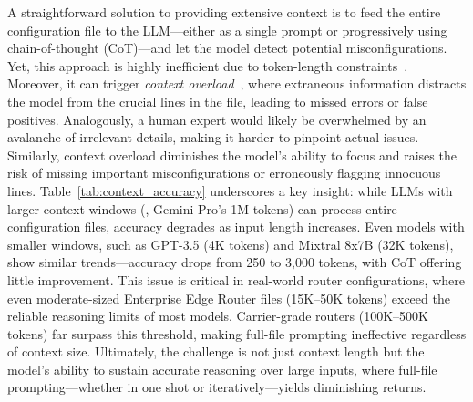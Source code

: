 \begin{table}
    \centering
\caption{Comparison of context window sizes and accuracy degradation with increasing input/prompt length.}
    \label{tab:context_accuracy}
\end{table}

 
A straightforward solution to providing extensive context is to feed the entire
configuration file to the LLM—either as a single prompt or progressively using chain-of-thought (CoT)—and let
the model detect potential misconfigurations. Yet, this approach is highly inefficient
due to token-length constraints~\cite{xue2024repeat,yu2024breaking,gu2023mamba}.
Moreover, it can trigger \emph{context overload}~\cite{lican,li2024long,qian2024long},
where extraneous information distracts the model from the crucial lines in the file,
leading to missed errors or false positives. Analogously, a human expert would likely
be overwhelmed by an avalanche of irrelevant details, making it harder to pinpoint
actual issues. Similarly, context overload diminishes the model’s ability to focus
and raises the risk of missing important misconfigurations or erroneously flagging
innocuous lines.
Table~\ref{tab:context_accuracy} underscores a key insight: while LLMs with larger context windows (\eg, Gemini Pro’s 1M tokens) can process entire configuration files, accuracy degrades as input length increases. Even models with smaller windows, such as GPT-3.5 (4K tokens) and Mixtral 8x7B (32K tokens), show similar trends—accuracy drops from 250 to 3,000 tokens, with CoT offering little improvement. This issue is critical in real-world router configurations, where even moderate-sized Enterprise Edge Router files (15K–50K tokens) exceed the reliable reasoning limits of most models. Carrier-grade routers (100K–500K tokens) far surpass this threshold, making full-file prompting ineffective regardless of context size. Ultimately, the challenge is not just context length but the model’s ability to sustain accurate reasoning over large inputs, where full-file prompting—whether in one shot or iteratively—yields diminishing returns.

